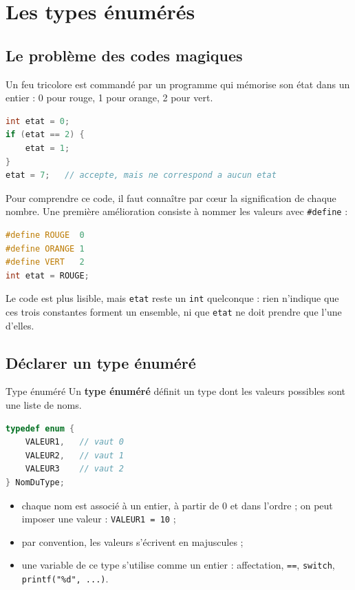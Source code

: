 \section{Les types énumérés}

\subsection{Le problème des codes magiques}

Un feu tricolore est commandé par un programme qui mémorise son état dans un entier : 0 pour rouge, 1 pour orange, 2 pour vert.

\begin{lstlisting}[language=c,caption={Codes entiers « magiques »},label=codeMagique]
int etat = 0;
if (etat == 2) {
    etat = 1;
}
etat = 7;   // accepte, mais ne correspond a aucun etat
\end{lstlisting}

Pour comprendre ce code, il faut connaître par cœur la signification de chaque nombre. Une première amélioration consiste à nommer les valeurs avec \texttt{\#define} :

\begin{lstlisting}[language=c,caption={Constantes \texttt{\#define}},label=codeDefine]
#define ROUGE  0
#define ORANGE 1
#define VERT   2
int etat = ROUGE;
\end{lstlisting}

Le code est plus lisible, mais \texttt{etat} reste un \texttt{int} quelconque : rien n'indique que ces trois constantes forment un ensemble, ni que \texttt{etat} ne doit prendre que l'une d'elles.

\subsection{Déclarer un type énuméré}

\begin{UPSTIinfor}{Type énuméré}
  Un \textbf{type énuméré} définit un type dont les valeurs possibles sont une liste de noms.
  \begin{lstlisting}[language=c,caption={Syntaxe}]
typedef enum {
    VALEUR1,   // vaut 0
    VALEUR2,   // vaut 1
    VALEUR3    // vaut 2
} NomDuType;
\end{lstlisting}
  \begin{itemize}
    \item chaque nom est associé à un entier, à partir de 0 et dans l'ordre ; on peut imposer une valeur : \texttt{VALEUR1 = 10} ;
    \item par convention, les valeurs s'écrivent en majuscules ;
    \item une variable de ce type s'utilise comme un entier : affectation, \texttt{==}, \texttt{switch}, \texttt{printf("\%d", ...)}.
  \end{itemize}
\end{UPSTIinfor}

